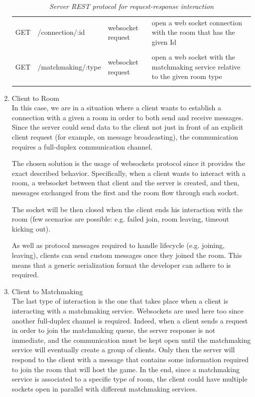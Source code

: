 \begin{enumerate}
\begin{table}[]
\begin{tabular}{p{2cm}p{4cm}p{2cm}p{5.5cm}}
			GET                  & /connection/:id    & websocket request & open a web socket connection with the room that has the given Id               	\\\\
			GET                  & /matchmaking/:type & websocket request & open a web socket with the matchmaking service relative to the given room type 	\\\\
		\end{tabular}
		\caption{\label{table:server_routes} \textit{Server REST protocol for request-response interaction}}
	\end{table}
	\item  Client to Room \\
	In this case, we are in a situation where a client wants to establish a connection with a given a room in order to both send and receive messages. Since the server could send data to the client not just in front of an explicit client request (for example, on message broadcasting), the communication requires a full-duplex communication channel.
	
	The chosen solution is the usage of websockets protocol since it provides the exact described behavior. Specifically, when a client wants to interact with a room, a websocket between that client and the server is created, and then, messages exchanged from the first and the room flow through such socket.
	
    The socket will be then closed when the client ends his interaction with the room (few scenarios are possible: e.g. failed join, room leaving, timeout kicking out).

 	As well as protocol messages required to handle lifecycle (e.g. joining, leaving),  clients can send custom messages once they joined the room. This means that a generic serialization format the developer can adhere to is required.
	
	
	\item Client to Matchmaking \\
	The last type of interaction is the one that takes place when a client is interacting with a matchmaking service. Websockets are used here too since another full-duplex channel is required. Indeed, when a client sends a request in order to join the matchmaking queue, the server response is not immediate, and the communication must be kept open until the matchmaking service will eventually create a group of clients. Only then the server will respond to the client with a message that contains some information required to join the room that will host the game.
	In the end, since a matchmaking service is associated to a specific type of room, the client could have multiple sockets open in parallel with different matchmaking services.
\end{enumerate}









